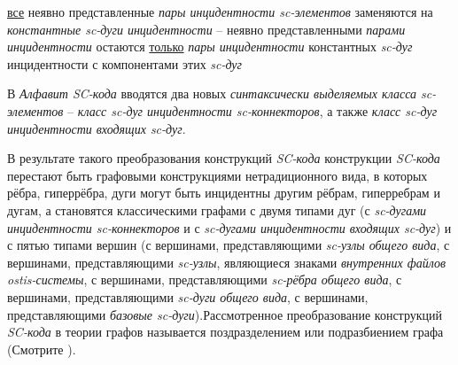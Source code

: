\begin{SCn}
\begin{scnstruct}
\begin{scnsubstruct}
{                \begin{scnitemize}
                    \item{\uline{все} неявно представленные \textit{пары инцидентности sc-элементов} заменяются на \textit{константные sc-дуги инцидентности} -- неявно представленными \textit{парами инцидентности} остаются \uline{только} \textit{пары инцидентности} константных \textit{sc-дуг} инцидентности с компонентами этих \textit{sc-дуг}}
                    \item{В \textit{Алфавит SC-кода} вводятся два новых \textit{синтаксически выделяемых класса sc-элементов} -- \textit{класс sc-дуг инцидентности sc-коннекторов}, а также \textit{класс sc-дуг инцидентности входящих sc-дуг}.}
                \end{scnitemize}
                В результате такого преобразования конструкций \textit{SC-кода} конструкции \textit{SC-кода} перестают быть графовыми конструкциями нетрадиционного вида, в которых рёбра, гиперрёбра, дуги могут быть инцидентны другим рёбрам, гиперребрам и дугам, а становятся классическими графами с двумя типами дуг (с \textit{sc-дугами инцидентности sc-коннекторов} и с \textit{sc-дугами инцидентности входящих sc-дуг}) и с пятью типами вершин (с вершинами, представляющими \textit{sc-узлы общего вида}, с вершинами, представляющими \textit{sc-узлы}, являющиеся знаками \textit{внутренних файлов ostis-системы}, с вершинами, представляющими \textit{sc-рёбра общего вида}, с вершинами, представляющими \textit{sc-дуги общего вида}, с вершинами, представляющими \textit{базовые sc-дуги}).Рассмотренное преобразование конструкций \textit{SC-кода} в теории графов называется поздразделением или подразбиением графа (Смотрите \cite{Trudeau1993}).}
            \end{scnsubstruct}
            \scnendsegmentcomment
            \bigskip
        \end{scnstruct}
    \scnendcurrentsectioncomment
    
    \end{SCn}
    \label{sd_sc_code_syntax}
    \label{sd_sc_code_semantic}